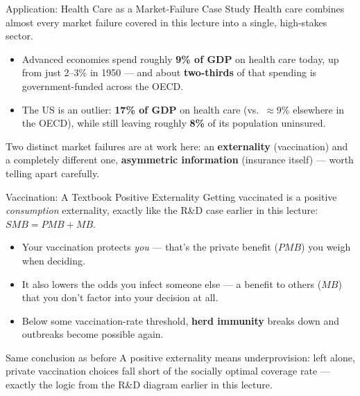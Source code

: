 \documentclass[11pt,aspectratio=169]{beamer}
\begin{document}
\begin{frame}{Application: Health Care as a Market-Failure Case Study}
  Health care combines almost every market failure covered in this lecture into a single, high-stakes sector.
  \begin{itemize}
    \item Advanced economies spend roughly \textbf{9\% of GDP} on health care today, up from just 2--3\% in 1950 --- and about \textbf{two-thirds} of that spending is government-funded across the OECD.
    \item The US is an outlier: \textbf{17\% of GDP} on health care (vs.\ $\approx$9\% elsewhere in the OECD), while still leaving roughly \textbf{8\%} of its population uninsured.
  \end{itemize}
  \vspace{0.4em}
  \small Two distinct market failures are at work here: an \textbf{externality} (vaccination) and a completely different one, \textbf{asymmetric information} (insurance itself) --- worth telling apart carefully.
\end{frame}

\begin{frame}{Vaccination: A Textbook Positive Externality}
  Getting vaccinated is a positive \emph{consumption} externality, exactly like the R\&D case earlier in this lecture: $SMB = PMB + MB$.
  \begin{itemize}
    \item Your vaccination protects \emph{you} --- that's the private benefit ($PMB$) you weigh when deciding.
    \item It also lowers the odds you infect someone else --- a benefit to others ($MB$) that you don't factor into your decision at all.
    \item Below some vaccination-rate threshold, \textbf{herd immunity} breaks down and outbreaks become possible again.
  \end{itemize}
  \vspace{0.4em}
  \begin{alertblock}{Same conclusion as before}
    A positive externality means underprovision: left alone, private vaccination choices fall short of the socially optimal coverage rate --- exactly the logic from the R\&D diagram earlier in this lecture.
  \end{alertblock}
\end{frame}
\end{document}

